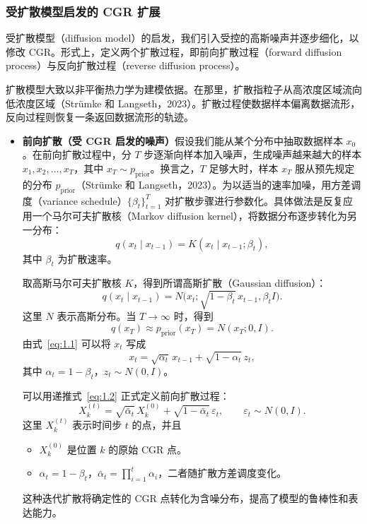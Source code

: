 \subsubsection{受扩散模型启发的 CGR 扩展}
受扩散模型（diffusion model）的启发，我们引入受控的高斯噪声并逐步细化，以修改 CGR。形式上，定义两个扩散过程，即前向扩散过程（forward diffusion process）与反向扩散过程（reverse diffusion process）。

扩散模型大致以非平衡热力学为建模依据。在那里，扩散指粒子从高浓度区域流向低浓度区域（Strümke 和 Langseth，2023）。扩散过程使数据样本偏离数据流形，反向过程则恢复一条返回数据流形的轨迹。

\begin{itemize}
  \item \textbf{前向扩散（受 CGR 启发的噪声）}\quad 假设我们能从某个分布中抽取数据样本 $x_0$。在前向扩散过程中，分 $T$ 步逐渐向样本加入噪声，生成噪声越来越大的样本 $x_1,x_2,\ldots,x_T$，其中 $x_T\sim p_{\mathrm{prior}}$。换言之，$T$ 足够大时，样本 $x_T$ 服从预先规定的分布 $p_{\mathrm{prior}}$（Strümke 和 Langseth，2023）。为以适当的速率加噪，用方差调度（variance schedule）$\{\beta_t\}_{t=1}^T$ 对扩散步骤进行参数化。具体做法是反复应用一个马尔可夫扩散核（Markov diffusion kernel），将数据分布逐步转化为另一分布：
  \[
    q(x_t\mid x_{t-1})=K(x_t\mid x_{t-1};\beta_t),
  \]
  其中 $\beta_t$ 为扩散速率。

  取高斯马尔可夫扩散核 $K$，得到所谓高斯扩散（Gaussian diffusion）：
  \begin{equation*}
    q(x_t\mid x_{t-1})
    =N\bigl(x_t;\sqrt{1-\beta_t}\,x_{t-1},\beta_t I\bigr).
    \tag{1.1}\label{eq:1.1}
  \end{equation*}
  这里 $N$ 表示高斯分布。当 $T\to\infty$ 时，得到
  \[
    q(x_T)\approx p_{\mathrm{prior}}(x_T)=N(x_T;0,I).
  \]
  由式~\eqref{eq:1.1} 可以将 $x_t$ 写成
  \begin{equation*}
    x_t=\sqrt{\alpha_t}\,x_{t-1}+\sqrt{1-\alpha_t}\,z_t,
    \tag{1.2}\label{eq:1.2}
  \end{equation*}
  其中 $\alpha_t=1-\beta_t$，$z_t\sim N(0,I)$。

  可以用递推式~\eqref{eq:1.2} 正式定义前向扩散过程：
  \begin{equation*}
    X_k^{(t)}
      =\sqrt{\bar\alpha_t}\,X_k^{(0)}+\sqrt{1-\bar\alpha_t}\,\varepsilon_t,
    \qquad \varepsilon_t\sim N(0,I).
    \tag{1.3}\label{eq:1.3}
  \end{equation*}
  这里 $X_k^{(t)}$ 表示时间步 $t$ 的点，并且
  \begin{itemize}
    \item $X_k^{(0)}$ 是位置 $k$ 的原始 CGR 点。
    \item $\alpha_t=1-\beta_t$，$\bar\alpha_t=\prod_{i=1}^t\alpha_i$，二者随扩散方差调度变化。
  \end{itemize}
  这种迭代扩散将确定性的 CGR 点转化为含噪分布，提高了模型的鲁棒性和表达能力。


\end{itemize}
